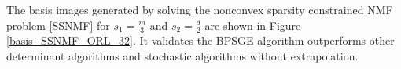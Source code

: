 \documentclass[letterpaper]{article} %
\begin{document}
	
	
	
	
	
	The basis images generated by solving the nonconvex sparsity constrained NMF problem \eqref{SSNMF} for $s_{1}=\frac{m}{3}$ and $s_{2}=\frac{d}{2}$ are shown in Figure \ref{basis_SSNMF_ORL_32}. It validates the BPSGE algorithm outperforms other determinant algorithms and stochastic algorithms without extrapolation. 
	
\end{document}
